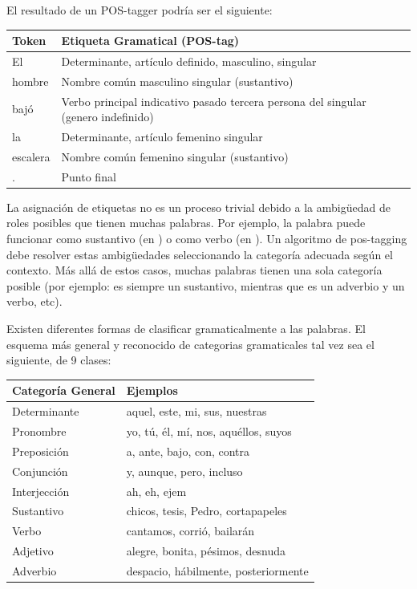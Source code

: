El resultado de un POS-tagger podría ser el siguiente:%

\begin{center}
\begin{tabular}{| l | l |}
 \hline
Token & Etiqueta Gramatical (POS-tag) \\ \hline
El  & Determinante, artículo definido, masculino, singular\\ \hline
hombre &  Nombre común masculino singular (sustantivo) \\ \hline
bajó  & Verbo principal indicativo pasado tercera persona del singular (genero indefinido)\\ \hline
la  & Determinante, artículo femenino singular \\ \hline
escalera & Nombre común femenino singular (sustantivo) \\ \hline
.  & Punto final\\ \hline
\end{tabular}
\end{center}

La asignación de etiquetas no es un proceso trivial debido a la ambigüedad de roles posibles que tienen muchas palabras. Por ejemplo, la palabra
 puede funcionar como sustantivo (en ) o como verbo (en ). 
Un algoritmo de pos-tagging debe resolver estas ambigüedades seleccionando la categoría adecuada según el contexto. Más allá de estos casos, muchas palabras tienen una sola categoría posible (por ejemplo:  es siempre un sustantivo, mientras que  es un adverbio y  un verbo, etc).

Existen diferentes formas de clasificar gramaticalmente a las palabras. El esquema más general y reconocido de categorias gramaticales tal vez sea el siguiente, de 9 clases:
\begin{center}
\begin{tabular}{| l | l |}
 \hline
Categoría General & Ejemplos \\ \hline 
Determinante & aquel, este, mi, sus, nuestras \\ \hline
Pronombre & yo, tú, él, mí, nos, aquéllos, suyos \\ \hline
Preposición & a, ante, bajo, con, contra\\ \hline
Conjunción & y, aunque, pero, incluso\\ \hline
Interjección & ah, eh, ejem\\ \hline
Sustantivo & chicos, tesis, Pedro, cortapapeles\\ \hline
Verbo & cantamos, corrió, bailarán\\ \hline
Adjetivo & alegre, bonita, pésimos, desnuda\\ \hline
Adverbio & despacio, hábilmente, posteriormente\\ \hline
\end{tabular}
\end{center}

